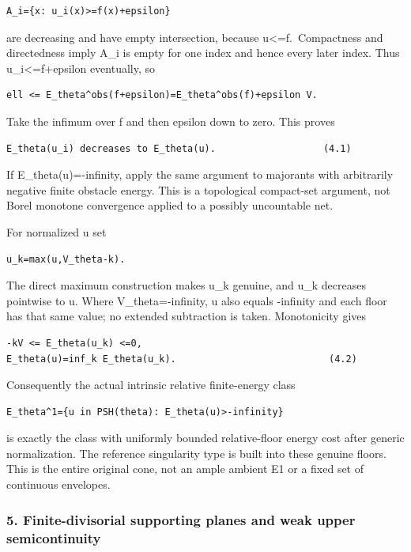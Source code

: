 \documentclass[
  10pt,
]{article}
\begin{document}
\begin{verbatim}
A_i={x: u_i(x)>=f(x)+epsilon}
\end{verbatim}

are decreasing and have empty intersection, because
u\textless=f.~Compactness and directedness imply A\_i is empty for one
index and hence every later index. Thus u\_i\textless=f+epsilon
eventually, so

\begin{verbatim}
ell <= E_theta^obs(f+epsilon)=E_theta^obs(f)+epsilon V.
\end{verbatim}

Take the infimum over f and then epsilon down to zero. This proves

\begin{verbatim}
E_theta(u_i) decreases to E_theta(u).                   (4.1)
\end{verbatim}

If E\_theta(u)=-infinity, apply the same argument to majorants with
arbitrarily negative finite obstacle energy. This is a topological
compact-set argument, not Borel monotone convergence applied to a
possibly uncountable net.

For normalized u set

\begin{verbatim}
u_k=max(u,V_theta-k).
\end{verbatim}

The direct maximum construction makes u\_k genuine, and u\_k decreases
pointwise to u. Where V\_theta=-infinity, u also equals -infinity and
each floor has that same value; no extended subtraction is taken.
Monotonicity gives

\begin{verbatim}
-kV <= E_theta(u_k) <=0,
E_theta(u)=inf_k E_theta(u_k).                           (4.2)
\end{verbatim}

Consequently the actual intrinsic relative finite-energy class

\begin{verbatim}
E_theta^1={u in PSH(theta): E_theta(u)>-infinity}
\end{verbatim}

is exactly the class with uniformly bounded relative-floor energy cost
after generic normalization. The reference singularity type is built
into these genuine floors. This is the entire original cone, not an
ample ambient E1 or a fixed set of continuous envelopes.

\subsubsection{5. Finite-divisorial supporting planes and weak upper
semicontinuity}\label{finite-divisorial-supporting-planes-and-weak-upper-semicontinuity}
\end{document}
